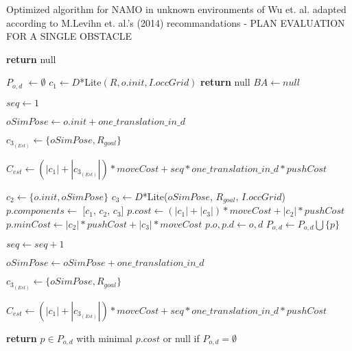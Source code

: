 \begin{algorithm}[H]

  \caption{Optimized algorithm for NAMO in unknown environments of Wu et. al. adapted according to M.Levihn et. al.'s (2014) recommandations - PLAN EVALUATION FOR A SINGLE OBSTACLE}

  \label{alg:02-levihn-planforobstacle}

  \begin{algorithmic}[1]


        \State \textbf{return} null
      \EndIf

      \State $P_{o,d}$ $\gets \emptyset$
      \State $c_{1} \gets D$*Lite$(R, o.init, I.occGrid)$ 
        \State \textbf{return} null
      \EndIf
      \State $BA \gets null$ 

       

        \State $seq \gets 1$ 

        \State $oSimPose \gets o.init + one\_translation\_in\_d$

        \State $c_{3_{(Est)}} \gets \{oSimPose, R_{goal}\}$

        \State $C_{est} \gets (|c_{1}| + |c_{3_{(Est)}}|) * moveCost + seq * one\_translation\_in\_d * pushCost$


            \State $c_{2} \gets \{o.init, oSimPose\}$
            \State $c_{3} \gets D$*Lite($oSimPose$, $R_{goal}$, $I.occGrid$)
              \State $p.components \gets$ [$c_{1}$, $c_{2}$, $c_{3}$]
              \State $p.cost \gets (|c_{1}| + |c_{3}|) * moveCost + |c_{2}| * pushCost$
              \State $p.minCost \gets |c_{2}| * pushCost + |c_{3}| * moveCost$
              \State $p.o, p.d \gets o, d$
              \State $P_{o,d} \gets P_{o,d} \bigcup \{p\}$
            \EndIf
          \EndIf

          \State $seq \gets seq + 1$

          \State $oSimPose \gets oSimPose + one\_translation\_in\_d$

          \State $c_{3_{(Est)}} \gets \{oSimPose, R_{goal}\}$

          \State $C_{est} \gets (|c_{1}| + |c_{3_{(Est)}}|) * moveCost + seq * one\_translation\_in\_d * pushCost$

        \EndWhile

      \EndFor

    \State \textbf{return} $p \in P_{o,d}$ with minimal $p.cost$ or null if $P_{o,d} = \emptyset$

    \EndProcedure

  \end{algorithmic}
\end{algorithm}
